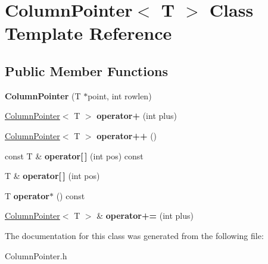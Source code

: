 \hypertarget{class_column_pointer}{}\section{Column\+Pointer$<$ T $>$ Class Template Reference}
\label{class_column_pointer}
\subsection*{Public Member Functions}
\begin{DoxyCompactItemize}
\item 
\mbox{\label{class_column_pointer_a3bb07e211b0dee00097a12d489c4c121}} 
{\bfseries Column\+Pointer} (T $\ast$point, int rowlen)
\item 
\mbox{\label{class_column_pointer_a83dd1f74b42bfaaececfdbc6c02699de}} 
\mbox{\hyperlink{class_column_pointer}{Column\+Pointer}}$<$ T $>$ {\bfseries operator+} (int plus)
\item 
\mbox{\label{class_column_pointer_aaa8fcc26bd03b839c6c56a2a7d10f808}} 
\mbox{\hyperlink{class_column_pointer}{Column\+Pointer}}$<$ T $>$ {\bfseries operator++} ()
\item 
\mbox{\label{class_column_pointer_a3490aad86bd6d789e111ee7f0cdfc1ea}} 
const T \& {\bfseries operator\mbox{[}$\,$\mbox{]}} (int pos) const
\item 
\mbox{\label{class_column_pointer_a3e4414ee9ea85e2883da9379fac42266}} 
T \& {\bfseries operator\mbox{[}$\,$\mbox{]}} (int pos)
\item 
\mbox{\label{class_column_pointer_af6dffbea8f7a7c8719188dc4b2be3583}} 
T {\bfseries operator$\ast$} () const
\item 
\mbox{\label{class_column_pointer_a1631b6037443f769928779e9a70ec962}} 
\mbox{\hyperlink{class_column_pointer}{Column\+Pointer}}$<$ T $>$ \& {\bfseries operator+=} (int plus)
\end{DoxyCompactItemize}


The documentation for this class was generated from the following file\+:\begin{DoxyCompactItemize}
\item 
Column\+Pointer.\+h\end{DoxyCompactItemize}
